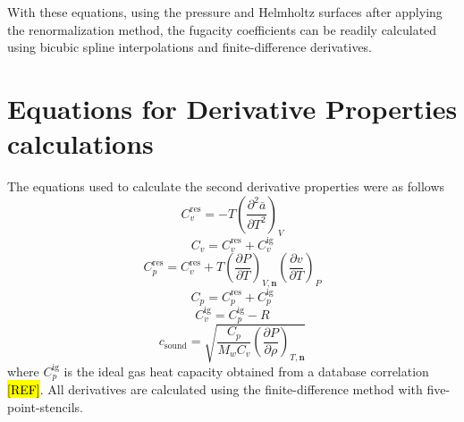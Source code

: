 \documentclass[preprint,12pt,3p]{elsarticle}
\begin{document}
\begin{appendices}
With these equations, using the pressure and Helmholtz surfaces after applying the renormalization method, the fugacity coefficients can be readily calculated using bicubic spline interpolations and finite-difference derivatives.

\setcounter{equation}{0}
\section{Equations for Derivative Properties calculations}

The equations used to calculate the second derivative properties were as follows
\begin{equation} \label{eq:Cvres_deriv}
C_{v}^\mathrm{res} = -T\left(\frac{\partial^{2}\bar{a}}{\partial T^{2}}\right)_{V}
\end{equation}
\begin{equation} \label{eq:Cv_deriv}
C_{v} = C_{v}^\mathrm{res} + C_{v}^\mathrm{ig}
\end{equation}
\begin{equation} \label{eq:Cpres_deriv}
C_{p}^\mathrm{res} = C_{v}^\mathrm{res} + T \left(\frac{\partial P}{\partial T}\right)_{V,\textbf{n}} \left(\frac{\partial v}{\partial T}\right)_{P}
\end{equation}
\begin{equation} \label{eq:Cp_deriv}
C_{p} = C_{p}^\mathrm{res} + C_{p}^\mathrm{ig}
\end{equation}
\begin{equation} \label{eq:Cvig_deriv}
C_{v}^\mathrm{ig} = C_{p}^\mathrm{ig} - R
\end{equation}
\begin{equation} \label{eq:u_deriv}
c_\mathrm{sound} = \sqrt{\frac{C_{p}}{M_{w} C_{v}}\left(\frac{\partial P}{\partial \rho}\right)_{T,\textbf{n}}}
\end{equation}
where $C_{p}^\mathrm{ig}$ is the ideal gas heat capacity obtained from a database correlation \hl{[REF]}.
All derivatives are calculated using the finite-difference method with five-point-stencils.

\end{appendices}

%

\nocite{*}

\section*{\refname}


\end{document}
